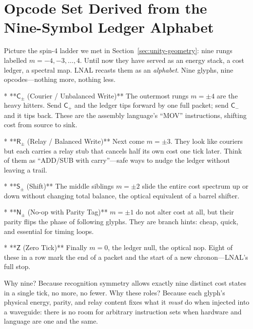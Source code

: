 \documentclass[11pt,oneside]{book}
\begin{document}
\section{Opcode Set Derived from the Nine-Symbol Ledger Alphabet}
\label{sec:lnal-opcode-narrative}

Picture the spin-4 ladder we met in
Section~\ref{sec:unity-geometry}: nine rungs labelled
\(m=-4,-3,\dots,4\).  
Until now they have served as an energy stack, a cost ledger, a
spectral map.  
LNAL recasts them as an \emph{alphabet}.  
Nine glyphs, nine opcodes—nothing more, nothing less.

* **$\mathsf{C}_{\pm}$ (Courier / Unbalanced Write)**  
  The outermost rungs \(m=\pm4\) are the heavy hitters.  
  Send \(\mathsf{C}_{+}\) and the ledger tips forward by one full
  packet; send \(\mathsf{C}_{-}\) and it tips back.  
  These are the assembly language’s “MOV” instructions, shifting
  cost from source to sink.

* **$\mathsf{R}_{\pm}$ (Relay / Balanced Write)**  
  Next come \(m=\pm3\).  
  They look like couriers but each carries a relay stub that cancels
  half its own cost one tick later.  
  Think of them as “ADD/SUB with carry”—safe ways to nudge the ledger
  without leaving a trail.

* **$\mathsf{S}_{\pm}$ (Shift)**  
  The middle siblings \(m=\pm2\) slide the entire cost spectrum up or
  down without changing total balance, the optical equivalent of a
  barrel shifter.

* **$\mathsf{N}_{\pm}$ (No-op with Parity Tag)**  
  \(m=\pm1\) do not alter cost at all, but their parity flips the phase
  of following glyphs.  
  They are branch hints: cheap, quick, and essential for timing loops.

* **$\mathsf{Z}$ (Zero Tick)**  
  Finally \(m=0\), the ledger null, the optical nop.  
  Eight of these in a row mark the end of a packet and the start of a
  new chronon—LNAL’s full stop.

Why nine?  
Because recognition symmetry allows exactly nine distinct
cost states in a single tick, no more, no fewer.  
Why these roles?  
Because each glyph’s physical energy, parity, and relay content fixes
what it \emph{must} do when injected into a waveguide: there is no
room for arbitrary instruction sets when hardware and language are one
and the same.
\end{document}
